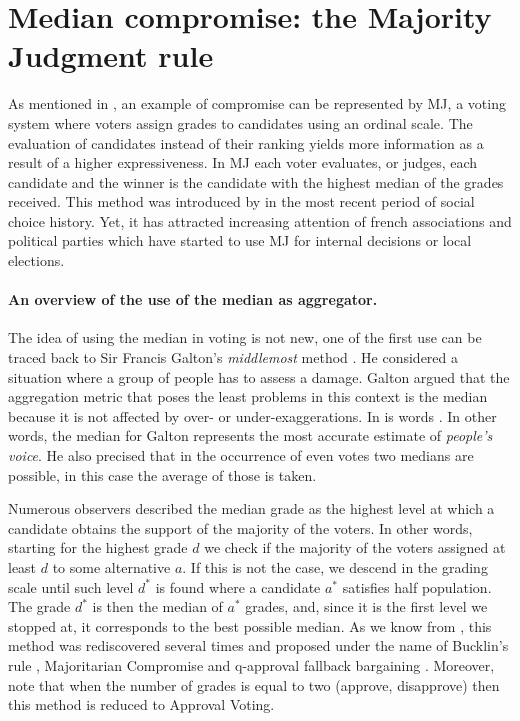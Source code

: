 \newpage
\section{Median compromise: the Majority Judgment rule}
\label{sec:litMJ}

As mentioned in , an example of compromise can be represented by \acl{MJ}, a voting system where voters assign grades to candidates using an ordinal scale. The evaluation of candidates instead of their ranking yields more information as a result of a higher expressiveness.
In \ac{MJ} each voter evaluates, or judges, each candidate and the winner is the candidate with the highest median of the grades received. 
This method was introduced by \citet{Balinski2007} in the most recent period of social choice history. Yet, it has attracted increasing attention of french associations and political parties which have started to use \ac{MJ} for internal decisions or local elections. 
\paragraph{An overview of the use of the median as aggregator.}
The idea of using the median in voting is not new, one of the first use can be traced back to Sir Francis Galton's \textit{middlemost} method \citep{Galton1907a,Galton1907b}. He considered a situation where a group of people has to assess a damage. Galton argued that the aggregation metric that poses the least problems in this context is the median because it is not affected by over- or under-exaggerations. In is words . In other words, the median for Galton represents the most accurate estimate of \textit{people's voice}. He also precised that in the occurrence of even votes two medians are possible, in this case the average of those is taken.

Numerous observers described the median grade as the highest level at which a candidate obtains the support of the majority of the voters. In other words, starting for the highest grade $d$ we check if the majority of the voters assigned at least $d$ to some alternative $a$. If this is not the case, we descend in the grading scale until such level $d^*$ is found where a candidate $a^*$ satisfies half population. The grade $d^*$ is then the median of $a^*$ grades, and, since it is the first level we stopped at, it corresponds to the best possible median. As we know from , this method was rediscovered several times and proposed under the name of Bucklin's rule \citep{Hoag1926}, Majoritarian Compromise \citep{Sertel1986,Sertel1999} and q-approval fallback bargaining \citep{Brams2001}. Moreover, note that when the number of grades is equal to two (approve, disapprove) then this method is reduced to Approval Voting.

